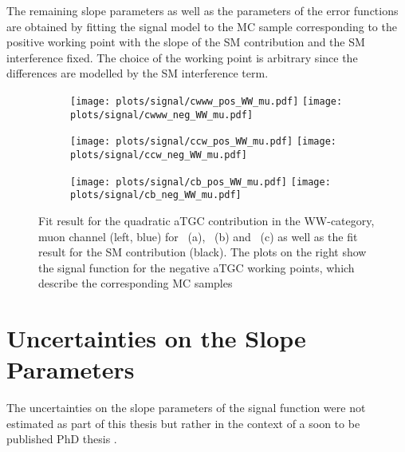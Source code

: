 The remaining slope parameters as well as the parameters of the error functions are obtained by fitting the signal model to the MC sample corresponding to the positive working point with the slope of the SM contribution and the SM interference fixed. The choice of the working point is arbitrary since the differences are modelled by the SM interference term.

\begin{figure}
	\centering
	\begin{subfigure}{\textwidth}
		\texttt{[image: plots/signal/cwww\_pos\_WW\_mu.pdf]}
		\texttt{[image: plots/signal/cwww\_neg\_WW\_mu.pdf]}
		\caption{}
	\end{subfigure}
	\begin{subfigure}{\textwidth}
		\texttt{[image: plots/signal/ccw\_pos\_WW\_mu.pdf]}
		\texttt{[image: plots/signal/ccw\_neg\_WW\_mu.pdf]}
		\caption{}
	\end{subfigure}
	\begin{subfigure}{\textwidth}
		\texttt{[image: plots/signal/cb\_pos\_WW\_mu.pdf]}
		\texttt{[image: plots/signal/cb\_neg\_WW\_mu.pdf]}
		\caption{}
	\end{subfigure}
	\caption[Fit result for the quadratic aTGC contribution in the WW-category, muon channel]{Fit result for the quadratic aTGC contribution in the WW-category, muon channel (left, blue) for \Tcwww \ (a), \Tccw \ (b) and \Tcb \ (c) as well as the fit result for the SM contribution (black). The plots on the right show the signal function for the negative aTGC working points, which describe the corresponding MC samples }
	\label{fig:signal:WW_mu_sig}
\end{figure}


\section{Uncertainties on the Slope Parameters}
\label{sec:uncslopesig}
The uncertainties on the slope parameters of the signal function were not estimated as part of this thesis but rather in the context of a soon to be published PhD thesis \cite{IVAN}.
